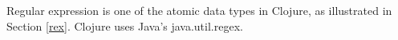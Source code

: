 
Regular expression is one of the atomic data types in Clojure, as illustrated in Section \ref{rex}. Clojure uses Java's java.util.regex.